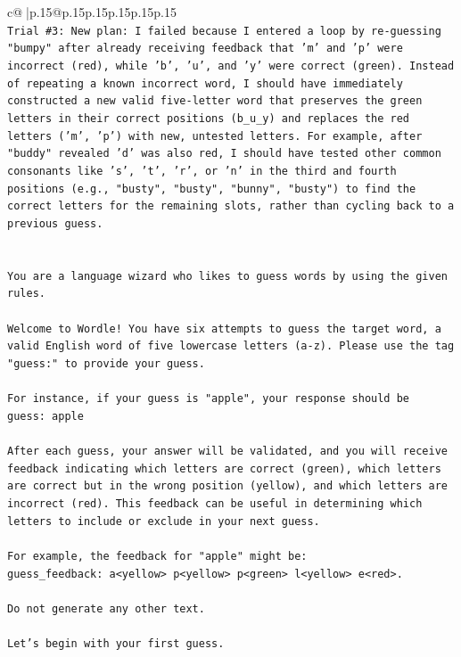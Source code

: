 \documentclass{article}
\begin{document}
{\begin{supertabular}{c@{$\;$}|p{.15\linewidth}@{}p{.15\linewidth}p{.15\linewidth}p{.15\linewidth}p{.15\linewidth}p{.15\linewidth}}
{{{\\ 
\texttt{Trial \#3: New plan: I failed because I entered a loop by re{-}guessing "bumpy" after already receiving feedback that 'm' and 'p' were incorrect (red), while 'b', 'u', and 'y' were correct (green). Instead of repeating a known incorrect word, I should have immediately constructed a new valid five{-}letter word that preserves the green letters in their correct positions (b\_u\_y) and replaces the red letters ('m', 'p') with new, untested letters. For example, after "buddy" revealed 'd' was also red, I should have tested other common consonants like 's', 't', 'r', or 'n' in the third and fourth positions (e.g., "busty", "busty", "bunny", "busty") to find the correct letters for the remaining slots, rather than cycling back to a previous guess.} \\
\\ 
\\ 
\texttt{You are a language wizard who likes to guess words by using the given rules.} \\
\\ 
\texttt{Welcome to Wordle! You have six attempts to guess the target word, a valid English word of five lowercase letters (a{-}z). Please use the tag "guess:" to provide your guess.} \\
\\ 
\texttt{For instance, if your guess is "apple", your response should be} \\
\texttt{guess: apple} \\
\\ 
\texttt{After each guess, your answer will be validated, and you will receive feedback indicating which letters are correct (green), which letters are correct but in the wrong position (yellow), and which letters are incorrect (red). This feedback can be useful in determining which letters to include or exclude in your next guess.} \\
\\ 
\texttt{For example, the feedback for "apple" might be:} \\
\texttt{guess\_feedback: a<yellow> p<yellow> p<green> l<yellow> e<red>.} \\
\\ 
\texttt{Do not generate any other text.} \\
\\ 
\texttt{Let's begin with your first guess.} \\
            }
        }
    }
     \\ \\


\end{supertabular}}
\end{document}
